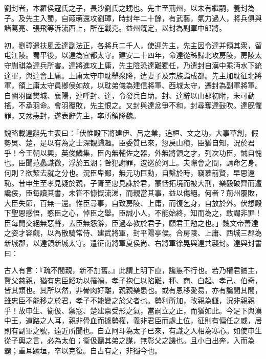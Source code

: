 
\begin{pinyinscope}
劉封者，本羅侯寇氏之子，長沙劉氏之甥也。先主至荊州，以未有繼嗣，養封為子。及先主入蜀，自葭萌還攻劉璋，時封年二十餘，有武藝，氣力過人，將兵俱與諸葛亮、張飛等泝流西上，所在戰克。益州旣定，以封為副軍中郎將。

初，劉璋遣扶風孟達副法正，各將兵二千人，使迎先主，先主因令達并領其衆，留屯江陵。蜀平後，以達為宜都太守。建安二十四年，命達從秭歸北攻房陵，房陵太守蒯祺為達兵所害。達將進攻上庸，先主陰恐達難獨任，乃遣封自漢中乘沔水下統達軍，與達會上庸。上庸太守申耽舉衆降，遣妻子及宗族詣成都。先主加耽征北將軍，領上庸太守員鄉侯如故，以耽弟儀為建信將軍、西城太守，遷封為副軍將軍。自關羽圍樊城、襄陽，連呼封、達，令發兵自助。封、達辭以山郡初附，未可動搖，不承羽命。會羽覆敗，先主恨之。又封與達忿爭不和，封尋奪達鼔吹。達旣懼罪，又忿恚封，遂表辭先主，率所領降魏。

魏略載達辭先主表曰：「伏惟殿下將建伊、呂之業，追桓、文之功，大事草創，假勢吳、楚，是以有為之士深覩歸趣。臣委質已來，愆戾山積，臣猶自知，況於君乎！今王朝以興，英俊鱗集，臣內無輔佐之器，外無將領之才，列次功臣，誠自愧也。臣聞范蠡識微，浮於五湖；咎犯謝罪，逡巡於河上。夫際會之間，請命乞身。何則？欲絜去就之分也。況臣卑鄙，無元功巨勳，自繫於時，竊慕前賢，早思遠恥。昔申生至孝見疑於親，子胥至忠見誅於君，蒙恬拓境而被大刑，樂毅破齊而遭讒佞，臣每讀其書，未甞不慷慨流涕，而親當其事，益以傷絕。何者？荊州覆敗，大臣失節，百無一還。惟臣尋事，自致房陵、上庸，而復乞身，自放於外。伏想殿下聖恩感悟，愍臣之心，悼臣之舉。臣誠小人，不能始終，知而為之，敢謂非罪！臣每閒交絕無惡聲，去臣無怨辭，臣過奉教於君子，願君王勉之也。」魏文帝善達之姿才容觀，以為散騎常侍、建武將軍，封平陽亭侯。合房陵、上庸、西城三郡為新城郡，以達領新城太守。遣征南將軍夏侯尚、右將軍徐晃與達共襲封。達與封書曰：

古人有言：『疏不間親，新不加舊。』此謂上明下直，讒慝不行也。若乃權君譎主，賢父慈親，猶有忠臣蹈功以罹禍，孝子抱仁以陷難，種、商、白起、孝己、伯奇，皆其類也。其所以然，非骨肉好離，親親樂患也。或有恩移愛易，亦有讒間其間，雖忠臣不能移之於君，孝子不能變之於父者也。勢利所加，改親為讎，況非親親乎！故申生、衞伋、禦寇、楚建禀受形之氣，當嗣立之正，而猶如此。今足下與漢中王，道路之人耳，親非骨血而據勢權，義非君臣而處上位，征則有偏任之威，居則有副軍之號，遠近所聞也。自立阿斗為太子已來，有識之人相為寒心。如使申生從子輿之言，必為太伯；衞伋聽其弟之謀，無彰父之譏也。且小白出奔，入而為霸；重耳踰垣，卒以克復。自古有之，非獨今也。


\end{pinyinscope}
